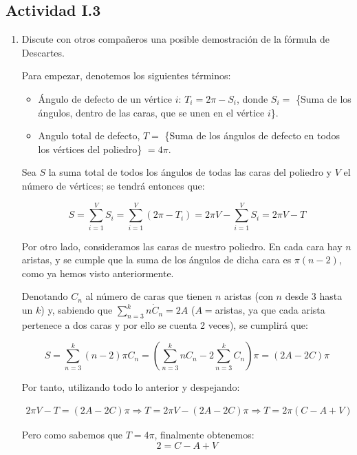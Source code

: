 \subsection{Actividad I.3}
\begin{enumerate}
	\item Discute con otros compañeros una posible demostración de la fórmula de Descartes.
	
	Para empezar, denotemos los siguientes términos:
	
	\begin{itemize}
		\item Ángulo de defecto de un vértice $i$: $T_i=2\pi-S_i$, donde $S_i=$ \{Suma de los ángulos, dentro de las caras, que se unen en el vértice $i$\}.
		
		\item Angulo total de defecto, $T=$ \{Suma de los ángulos de defecto en todos los vértices del poliedro\} $=4\pi$.
	\end{itemize}
	
	Sea $S$ la suma total de todos los ángulos de todas las caras del poliedro y $V$ el número de vértices; se tendrá entonces que:
	
	\[
	S = \sum_{i=1}^{V}S_i = \sum_{i=1}^{V} (2\pi-T_i)=2\pi V -\sum_{i=1}^{V}S_i = 2\pi V - T
	\]
	
	Por otro lado, consideramos las caras de nuestro poliedro. En cada cara hay $n$ aristas, y se cumple que la suma de los ángulos de dicha cara es $\pi(n-2)$, como ya hemos visto anteriormente.
	
	Denotando $C_n$ al número de caras que tienen $n$ aristas (con $n$ desde 3 hasta un $k$) y, sabiendo que $\sum_{n=3}^{k}n\dot C_n = 2A$ ($A=$aristas, ya que cada arista pertenece a dos caras y por ello se cuenta 2 veces), se cumplirá que:
	
	\[
	S=\sum_{n=3}^{k}(n-2)\pi C_n=(\sum_{n=3}^{k} nC_n-2\sum_{n=3}^{k}C_n)\pi = (2A-2C)\pi 
	\]
	
	Por tanto, utilizando todo lo anterior y despejando:
	
	\begin{align*}
		2\pi V - T =  (2A-2C)\pi
		\Longrightarrow T  = 2 \pi V-(2A-2C)\pi
		\Longrightarrow T = 2\pi(C-A+V)  
	\end{align*}
	
	Pero como sabemos que $T=4\pi$, finalmente obtenemos:
	\[
	2=C-A+V
	\]
\end{enumerate}

